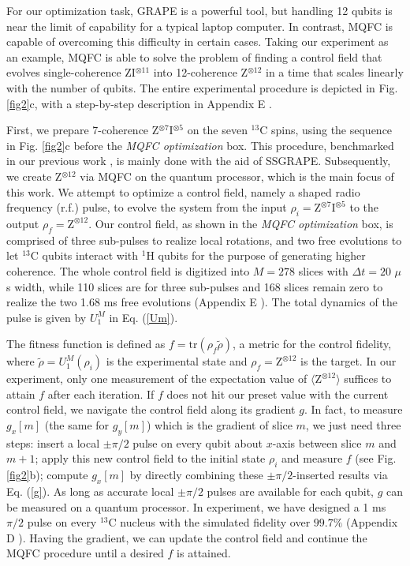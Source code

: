 \documentclass[twocolumn,reprint, amsmath,amssymb,showpacs,superscriptaddress]{revtex4-1}
\newcommand{\tr}{\textrm{tr}}
\begin{document}
For our optimization task, GRAPE is a powerful tool, but handling 12 qubits is near the limit of capability for a typical laptop computer. In contrast, MQFC is capable of overcoming this difficulty in certain cases. Taking our experiment as an example, MQFC is able to solve the problem of finding a control field that evolves single-coherence ZI$^{\otimes 11}$ into 12-coherence Z$^{\otimes 12}$ in a time that scales linearly with the number of qubits. The entire experimental procedure is depicted in Fig. \ref{fig2}c, with a step-by-step description in Appendix E \cite{supple}.

First, we prepare 7-coherence Z$^{\otimes 7}$I$^{\otimes 5}$ on the seven $^{13}$C spins, using the sequence in Fig. \ref{fig2}c before the \emph{MQFC optimization} box. This procedure, benchmarked in our previous work \cite{lu2015experimental}, is mainly done with the aid of SSGRAPE. Subsequently, we create Z$^{\otimes 12}$ via MQFC on the quantum processor, which is the main focus of this work. We attempt to optimize a control field, namely a shaped radio frequency (r.f.) pulse, to evolve the system from the input $\rho_{i} = \text{Z}^{\otimes 7}\text{I}^{\otimes 5}$ to the output $\rho_{f} = \text{Z}^{\otimes 12}$. Our control field, as shown in the \emph{MQFC optimization} box, is comprised of three sub-pulses to realize local rotations, and two free evolutions to let $^{13}$C qubits interact with $^{1}$H qubits for the purpose of generating higher coherence. The whole control field is digitized into $M=278$ slices with $\Delta t=20$ $\mu$s width, while 110 slices are for three sub-pulses and 168 slices remain zero to realize the two 1.68 ms free evolutions (Appendix E \cite{supple}). The total dynamics of the pulse is given by $U_{1}^{M}$ in Eq. (\ref{Um}).

The fitness function is defined as $f = \tr (\rho_{f} \tilde{\rho})$, a metric for the control fidelity, where $\tilde{\rho}=U_{1}^{M}(\rho_{i})$ is the experimental state and $\rho_{f}= \text{Z}^{\otimes 12}$ is the target. In our experiment, only one measurement of the expectation value of $\langle \text{Z}^{\otimes 12} \rangle$ suffices to attain $f$ after each iteration. If $f$ does not hit our preset value with the current control field, we navigate the control field along its gradient $g$. In fact, to measure $g_x[m]$ (the same for $g_y[m]$) which is the gradient of slice $m$, we just need three steps: insert a local $\pm\pi/2$ pulse on every qubit about $x$-axis between slice $m$ and $m+1$; apply this new control field to the initial state $\rho_i$ and measure $f$ (see Fig. \ref{fig2}b); compute $g_x[m]$ by directly combining these $\pm\pi/2$-inserted results via Eq. (\ref{g}). As long as accurate local $\pm\pi/2$ pulses are available for each qubit, $g$ can be measured on a quantum processor. In experiment, we have designed a 1 ms $\pi/2$ pulse on every $^{13}$C nucleus with the simulated fidelity over $99.7\%$ (Appendix D \cite{supple}). Having the gradient, we can update the control field and continue the MQFC procedure until a desired $f$ is attained.
\end{document}
